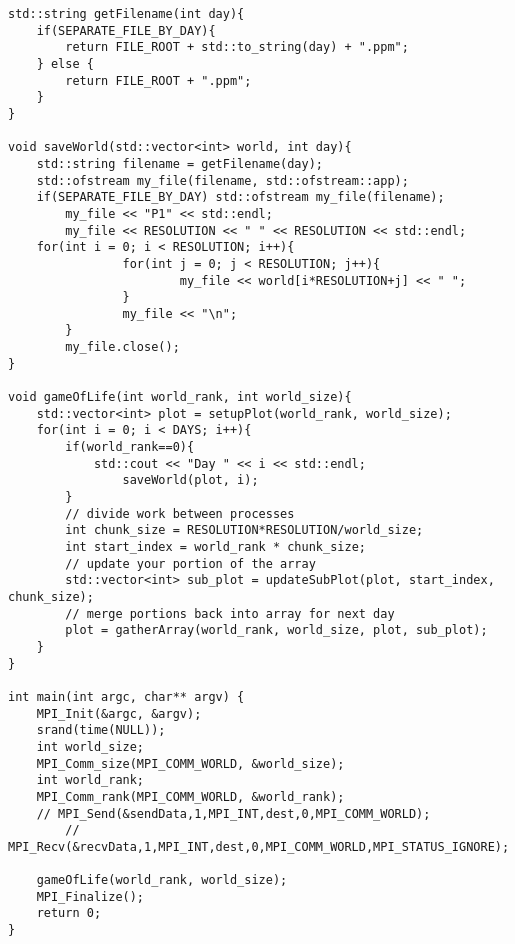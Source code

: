\documentclass[12pt]{article}
\begin{document}
\begin{verbatim}
std::string getFilename(int day){
	if(SEPARATE_FILE_BY_DAY){
		return FILE_ROOT + std::to_string(day) + ".ppm";
	} else {
		return FILE_ROOT + ".ppm";
	}
}

void saveWorld(std::vector<int> world, int day){
	std::string filename = getFilename(day);
	std::ofstream my_file(filename, std::ofstream::app);
	if(SEPARATE_FILE_BY_DAY) std::ofstream my_file(filename);
        my_file << "P1" << std::endl;
        my_file << RESOLUTION << " " << RESOLUTION << std::endl;
	for(int i = 0; i < RESOLUTION; i++){
                for(int j = 0; j < RESOLUTION; j++){
                        my_file << world[i*RESOLUTION+j] << " ";
                }
                my_file << "\n";
        }
        my_file.close();
}

void gameOfLife(int world_rank, int world_size){
	std::vector<int> plot = setupPlot(world_rank, world_size);
	for(int i = 0; i < DAYS; i++){
		if(world_rank==0){
			std::cout << "Day " << i << std::endl;
		       	saveWorld(plot, i);
		}
		// divide work between processes
		int chunk_size = RESOLUTION*RESOLUTION/world_size;
		int start_index = world_rank * chunk_size;
		// update your portion of the array
		std::vector<int> sub_plot = updateSubPlot(plot, start_index, chunk_size);
		// merge portions back into array for next day
		plot = gatherArray(world_rank, world_size, plot, sub_plot);
	}	
}

int main(int argc, char** argv) {
	MPI_Init(&argc, &argv);
	srand(time(NULL));
	int world_size;
	MPI_Comm_size(MPI_COMM_WORLD, &world_size);
	int world_rank;
	MPI_Comm_rank(MPI_COMM_WORLD, &world_rank);
	// MPI_Send(&sendData,1,MPI_INT,dest,0,MPI_COMM_WORLD);
        // MPI_Recv(&recvData,1,MPI_INT,dest,0,MPI_COMM_WORLD,MPI_STATUS_IGNORE);

	gameOfLife(world_rank, world_size);
	MPI_Finalize();
	return 0;
}


\end{verbatim}
\end{document}
